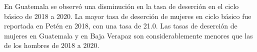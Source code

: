 En Guatemala se observó una disminución en la tasa de deserción en el ciclo básico de 2018 a 2020. La mayor tasa de deserción de mujeres en ciclo básico fue reportada en Petén en 2018, con una tasa de 21.0. Las tasas de deserción de mujeres en Guatemala y en Baja Verapaz son considerablemente menores que las de los hombres de 2018 a 2020.